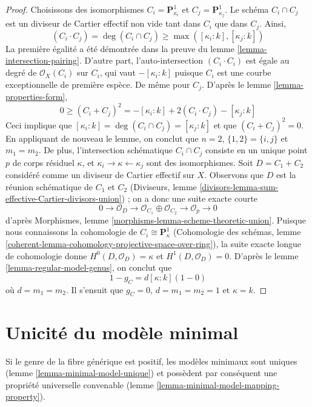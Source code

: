 \begin{proof}
Choisissons des isomorphismes $C_i = \mathbf{P}^1_{\kappa_i}$ et
$C_j = \mathbf{P}^1_{\kappa_j}$. Le schéma $C_i \cap C_j$
est un diviseur de Cartier effectif non vide tant dans $C_i$ que dans $C_j$.
Ainsi,
$$
(C_i \cdot C_j) = \deg(C_i \cap C_j) \geq \max([\kappa_i: k], [\kappa_j : k])
$$
La première égalité a été démontrée dans la preuve du
lemme \ref{lemma-intersection-pairing}.
D'autre part, l'auto-intersection $(C_i \cdot C_i)$ est égale
au degré de $\mathcal{O}_X(C_i)$ sur $C_i$, qui vaut $-[\kappa_i : k]$
puisque $C_i$ est une courbe exceptionnelle de première espèce. De même pour
$C_j$. D'après le lemme \ref{lemma-properties-form},
$$
0 \geq (C_i + C_j)^2 = -[\kappa_i : k] + 2(C_i \cdot C_j) - [\kappa_j : k]
$$
Ceci implique que $[\kappa_i : k] = \deg(C_i \cap C_j) = [\kappa_j : k]$
et que $(C_i + C_j)^2 = 0$. En appliquant de nouveau le lemme,
on conclut que $n = 2$, $\{1, 2\} = \{i, j\}$ et $m_1 = m_2$.
De plus, l'intersection schématique $C_i \cap C_j$ consiste en
un unique point $p$ de corps résiduel $\kappa$, et
$\kappa_i \to \kappa \leftarrow \kappa_j$ sont des isomorphismes.
Soit $D = C_1 + C_2$ considéré comme un diviseur de Cartier effectif sur $X$.
Observons que $D$ est la réunion schématique de $C_1$ et $C_2$
(Diviseurs, lemme \ref{divisors-lemma-sum-effective-Cartier-divisors-union}) ;
on a donc une suite exacte courte
$$
0 \to \mathcal{O}_D \to \mathcal{O}_{C_1} \oplus \mathcal{O}_{C_2} \to
\mathcal{O}_p \to 0
$$
d'après Morphismes, lemme \ref{morphisms-lemma-scheme-theoretic-union}.
Puisque nous connaissons la cohomologie de $C_i \cong \mathbf{P}^1_\kappa$
(Cohomologie des schémas, lemme
\ref{coherent-lemma-cohomology-projective-space-over-ring}),
la suite exacte longue de cohomologie donne
$H^0(D, \mathcal{O}_D) = \kappa$ et
$H^1(D, \mathcal{O}_D) = 0$. D'après le lemme \ref{lemma-regular-model-genus},
on conclut que
$$
1 - g_C = d[\kappa : k](1 - 0)
$$
où $d = m_1 = m_2$. Il s'ensuit que $g_C = 0$, $d = m_1 = m_2 = 1$
et $\kappa = k$.
\end{proof}





\section{Unicité du modèle minimal}
\label{section-uniqueness}

\noindent
Si le genre de la fibre générique est positif, les modèles minimaux sont uniques
(lemme \ref{lemma-minimal-model-unique}) et possèdent par conséquent une propriété
universelle convenable (lemme \ref{lemma-minimal-model-mapping-property}).

